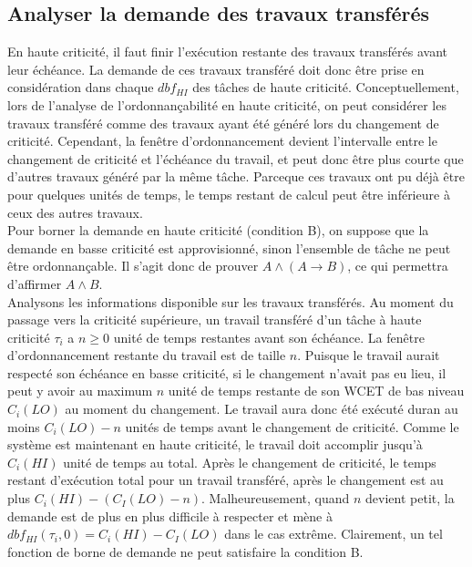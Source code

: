 \documentclass[12pt,a4paper,oneside]{book}
\theoremstyle{break}
\theoremstyle{breakplain}
\begin{document}
\subsection{Analyser la demande des travaux transférés}
En haute criticité, il faut finir l'exécution restante des travaux transférés avant leur échéance. La demande de ces travaux transféré doit donc être prise en considération dans chaque $dbf_{HI}$ des tâches de haute criticité. Conceptuellement, lors de l'analyse de l'ordonnançabilité en haute criticité, on peut considérer les travaux transféré comme des travaux ayant été généré lors du changement de criticité. Cependant, la fenêtre d'ordonnancement devient l'intervalle entre le changement de criticité et l'échéance du travail, et peut donc être plus courte que d'autres travaux généré par la même tâche. Parceque ces travaux ont pu déjà être pour quelques unités de temps, le temps restant de calcul peut être inférieure à ceux des autres travaux.\\


Pour borner la demande en haute criticité (condition B), on suppose que la demande en basse criticité est approvisionné, sinon l'ensemble de tâche ne peut être ordonnançable. Il s'agit donc de prouver $A \wedge (A \rightarrow B)$, ce qui permettra d'affirmer $A\wedge B$.\\

Analysons les informations disponible sur les travaux transférés. Au moment du passage vers la criticité supérieure, un travail transféré d'un tâche à haute criticité $\tau_i$ a $n\ge 0$ unité de temps restantes avant son échéance. La fenêtre d'ordonnancement restante du travail est de taille $n$. Puisque le travail aurait respecté son échéance en basse criticité, si le changement n'avait pas eu lieu, il peut y avoir au maximum $n$ unité de temps restante de son WCET de bas niveau $C_i(LO)$ au moment du changement. Le travail aura donc été exécuté duran au moins $C_i(LO) -n$ unités de temps avant le changement de criticité. Comme le système est maintenant en haute criticité, le travail doit accomplir jusqu'à $C_i(HI)$ unité de temps au total. Après le changement de criticité, le temps restant d'exécution total pour un travail transféré, après le changement est au plus $C_i(HI) - (C_I(LO)-n)$. Malheureusement, quand $n$ devient petit, la demande est de plus en plus difficile à respecter et mène à $dbf_{HI}(\tau_i,0) = C_i(HI) - C_I(LO)$ dans le cas extrême. Clairement, un tel fonction de borne de demande ne peut satisfaire la condition B.
\end{document}
